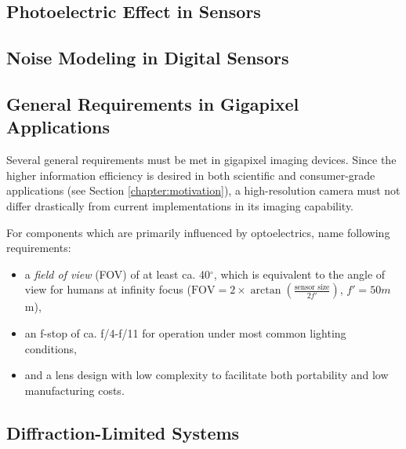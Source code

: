 \subsection{Photoelectric Effect in Sensors}



\subsection{Noise Modeling in Digital Sensors}



\subsection{General Requirements in Gigapixel Applications}

Several general requirements must be met in gigapixel imaging devices. Since the higher information efficiency is desired in both scientific and consumer-grade applications (see Section \ref{chapter:motivation}), a high-resolution camera must not differ drastically from current implementations in its imaging capability.

For components which are primarily influenced by optoelectrics, \cite{GigaOptik} name following requirements:

\begin{itemize}
    \item a \textit{field of view} (FOV) of at least ca. 40$^\circ$, which is equivalent to the angle of view for humans at infinity focus ($\mathrm{FOV} = 2 \times \arctan\left(\frac{\text{sensor size}}{2{f}'}\right)$, ${f}' = 50m$m),
    \item an f-stop of ca. f/4-f/11 for operation under most common lighting conditions,
    \item and a lens design with low complexity to facilitate both portability and low manufacturing costs.
\end{itemize}

\subsection{Diffraction-Limited Systems}%

\label{chapter:diff}
